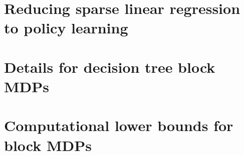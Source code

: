 \documentclass[11pt, oneside]{article}
\theoremstyle{plain}
\theoremstyle{definition}
\numberwithin{theorem}{section}
\renewcommand{\^}[1]{^{(#1)}}
\begin{document}


\section{Reducing sparse linear regression to policy learning}\label{app:slr-to-rl}




\section{Details for decision tree block MDPs}\label{sec:dec-tree-linear}



\section{Computational lower bounds for block MDPs}\label{sec:block-lb}


\end{document}
